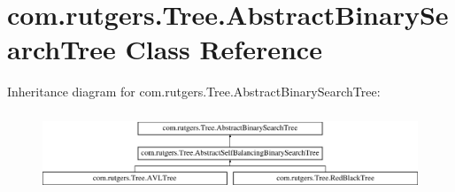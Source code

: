 \hypertarget{classcom_1_1rutgers_1_1Tree_1_1AbstractBinarySearchTree}{}\section{com.\+rutgers.\+Tree.\+Abstract\+Binary\+Search\+Tree Class Reference}
\label{classcom_1_1rutgers_1_1Tree_1_1AbstractBinarySearchTree}
Inheritance diagram for com.\+rutgers.\+Tree.\+Abstract\+Binary\+Search\+Tree\+:\begin{figure}[H]
\begin{center}
\leavevmode
\includegraphics[height=2.400000cm]{classcom_1_1rutgers_1_1Tree_1_1AbstractBinarySearchTree}
\end{center}
\end{figure}
